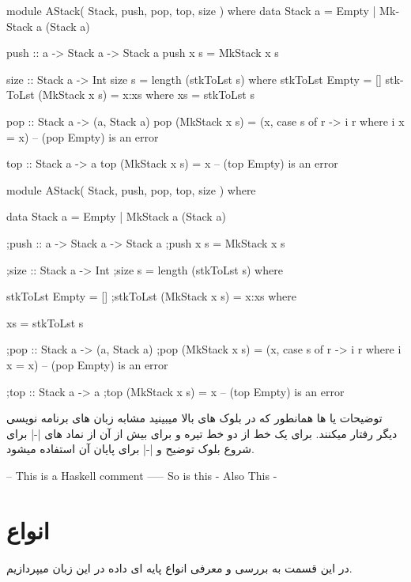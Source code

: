 \begin{latin}
\begin{ghcode}
module AStack( Stack, push, pop, top, size ) where  
data Stack a = Empty  
             | MkStack a (Stack a)  
 
push :: a -> Stack a -> Stack a  
push x s = MkStack x s  
 
size :: Stack a -> Int  
size s = length (stkToLst s)  where  
           stkToLst  Empty         = []  
           stkToLst (MkStack x s)  = x:xs where xs = stkToLst s  
 
pop :: Stack a -> (a, Stack a)  
pop (MkStack x s)  
  = (x, case s of r -> i r where i x = x) -- (pop Empty) is an error  
 
top :: Stack a -> a  
top (MkStack x s) = x                     -- (top Empty) is an error
\end{ghcode}
\end{latin}

\begin{latin}
\begin{ghcode}
module AStack( Stack, push, pop, top, size ) where  
{data Stack a = Empty  
             | MkStack a (Stack a)  
 
;push :: a -> Stack a -> Stack a  
;push x s = MkStack x s  
 
;size :: Stack a -> Int  
;size s = length (stkToLst s)  where  
           {stkToLst  Empty         = []  
           ;stkToLst (MkStack x s)  = x:xs where {xs = stkToLst s  
 
}};pop :: Stack a -> (a, Stack a)  
;pop (MkStack x s)  
  = (x, case s of {r -> i r where {i x = x}}) -- (pop Empty) is an error  
 
;top :: Stack a -> a  
;top (MkStack x s) = x                        -- (top Empty) is an error  
}
\end{ghcode}
\end{latin}
\newline
توضیحات یا 
ها همانطور که در بلوک های بالا میبینید مشابه زبان های برنامه نویسی دیگر رفتار میکنند. برای یک خط از دو  خط تیره و برای بیش از آن از نماد های 
\hs|{-|
 برای شروع بلوک توضیح و 
\hs|-}|
 برای پایان آن استفاده میشود.
\begin{latin}
\begin{ghcode}
-- This is a Haskell comment
----- So is this
{- Also 
        This
-}
\end{ghcode}
\end{latin}

\section{
انواع
}
در این قسمت به بررسی و معرفی انواع پایه ای داده در این زبان میپردازیم. 
